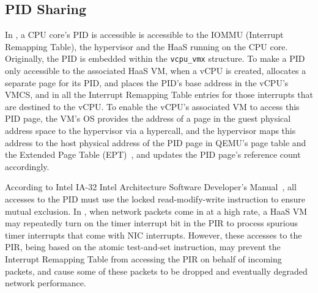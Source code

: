 \subsection{PID Sharing}

In \sna, a CPU core's PID is accessible is accessible to the IOMMU (Interrupt Remapping Table), the hypervisor and the HaaS running on the CPU core. 
Originally, the PID  is embedded within the
\texttt{vcpu\_vmx} structure. To make a PID only accessible to the associated HaaS VM,
when a vCPU is created, \na allocates a separate page for its PID, and places the PID's base address in the vCPU's VMCS, and in all the Interrupt Remapping Table entries for those interrupts that are destined to the vCPU.
To enable the vCPU's associated VM to access this PID page, the VM's OS provides the address of a page in the guest physical address space to the hypervisor via a hypercall, and the hypervisor maps this address to the host physical address of the PID page in QEMU's page table and the Extended Page Table (EPT)~\cite{ept-wiki}, and updates the PID page's reference count accordingly.
   

According to Intel IA-32 Intel Architecture Software Developer's
Manual~\cite{sdm:2018}, all accesses to the PID
must use the locked read-modify-write instruction to ensure mutual exclusion. 
In \sna, when network packets come in at a high rate, a HaaS VM may repeatedly turn on the timer interrupt bit in the PIR to process spurious timer interrupts that come with NIC interrupts. However, these accesses to the PIR, being based on the atomic test-and-set instruction, may prevent the Interrupt Remapping Table from accessing the PIR on behalf of incoming packets, and cause some of these packets to be dropped and eventually degraded network performance.
 

